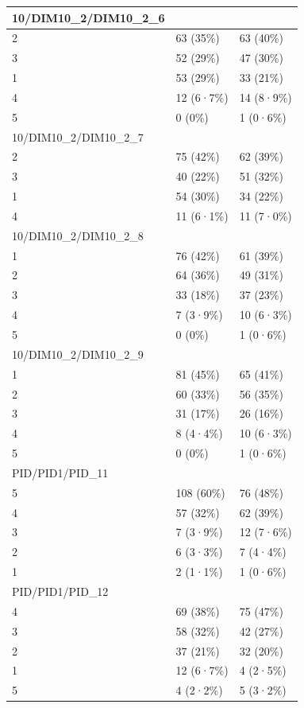 \documentclass[
]{book}
\begin{document}
\begin{tabular}{l|l|l}
\hline
10/DIM10\_2/DIM10\_2\_6 &  & \\
\hline
2 & 63 (35\%) & 63 (40\%)\\
\hline
3 & 52 (29\%) & 47 (30\%)\\
\hline
1 & 53 (29\%) & 33 (21\%)\\
\hline
4 & 12 (6·7\%) & 14 (8·9\%)\\
\hline
5 & 0 (0\%) & 1 (0·6\%)\\
\hline
10/DIM10\_2/DIM10\_2\_7 &  & \\
\hline
2 & 75 (42\%) & 62 (39\%)\\
\hline
3 & 40 (22\%) & 51 (32\%)\\
\hline
1 & 54 (30\%) & 34 (22\%)\\
\hline
4 & 11 (6·1\%) & 11 (7·0\%)\\
\hline
10/DIM10\_2/DIM10\_2\_8 &  & \\
\hline
1 & 76 (42\%) & 61 (39\%)\\
\hline
2 & 64 (36\%) & 49 (31\%)\\
\hline
3 & 33 (18\%) & 37 (23\%)\\
\hline
4 & 7 (3·9\%) & 10 (6·3\%)\\
\hline
5 & 0 (0\%) & 1 (0·6\%)\\
\hline
10/DIM10\_2/DIM10\_2\_9 &  & \\
\hline
1 & 81 (45\%) & 65 (41\%)\\
\hline
2 & 60 (33\%) & 56 (35\%)\\
\hline
3 & 31 (17\%) & 26 (16\%)\\
\hline
4 & 8 (4·4\%) & 10 (6·3\%)\\
\hline
5 & 0 (0\%) & 1 (0·6\%)\\
\hline
PID/PID1/PID\_11 &  & \\
\hline
5 & 108 (60\%) & 76 (48\%)\\
\hline
4 & 57 (32\%) & 62 (39\%)\\
\hline
3 & 7 (3·9\%) & 12 (7·6\%)\\
\hline
2 & 6 (3·3\%) & 7 (4·4\%)\\
\hline
1 & 2 (1·1\%) & 1 (0·6\%)\\
\hline
PID/PID1/PID\_12 &  & \\
\hline
4 & 69 (38\%) & 75 (47\%)\\
\hline
3 & 58 (32\%) & 42 (27\%)\\
\hline
2 & 37 (21\%) & 32 (20\%)\\
\hline
1 & 12 (6·7\%) & 4 (2·5\%)\\
\hline
5 & 4 (2·2\%) & 5 (3·2\%)\\

\end{tabular}
\end{document}
